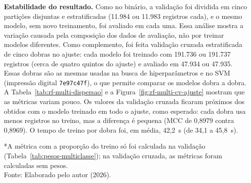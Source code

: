 \documentclass[
    12pt,                %
    openright,           %
    oneside,             %
    a4paper,             %
    english,             %
    brazil               %
]{abntex2}
\begin{document}
\textbf{Estabilidade do resultado.} Como no binário, a validação foi dividida em cinco partições disjuntas e estratificadas (11.984 ou 11.983 registros cada), e o mesmo modelo, sem novo treinamento, foi avaliado em cada uma. Essa análise mostra a variação causada pela composição dos dados de avaliação, não por treinar modelos diferentes. Como complemento, foi feita validação cruzada estratificada de cinco dobras no ajuste: cada modelo foi treinado com 191.736 ou 191.737 registros (cerca de quatro quintos do ajuste) e avaliado em 47.934 ou 47.935. Essas dobras são as mesmas usadas na busca de hiperparâmetros e no SVM (impressão digital \texttt{7e97c47f}), o que permite comparar os modelos dobra a dobra. A Tabela~\ref{tab:rf-multi-dispersao} e a Figura~\ref{fig:rf-multi-cv-ajuste} mostram que as métricas variam pouco. Os valores da validação cruzada ficaram próximos dos obtidos com o modelo treinado em todo o ajuste, como esperado: cada dobra usa menos registros no treino, mas a diferença é pequena (MCC de 0,8979 contra 0,8969). O tempo de treino por dobra foi, em média, 42,2~s (de 34,1 a 45,8~s).
 
\begin{table}
\centering
\caption{Dispersão das métricas do RF multiclasse (média $\pm$ desvio-padrão; mín--máx)}
\label{tab:rf-multi-dispersao}
\par\smallskip
*A métrica com a proporção do treino só foi calculada na validação (Tabela~\ref{tab:pesos-multiclasse}); na validação cruzada, as métricas foram calculadas sem pesos.\\
Fonte: Elaborado pelo autor (2026).
\end{table}
 
\end{document}

